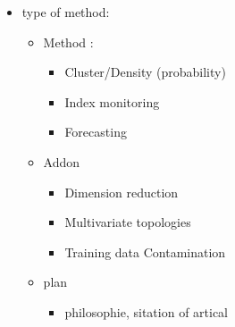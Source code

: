 \documentclass[./overview.tex]{subfiles}
\begin{document}
    \begin{itemize}
        \item type of method:
        \begin{itemize}
            \item Method :
            \begin{itemize}
                \item Cluster/Density (probability)
                \item Index monitoring
                \item Forecasting
            \end{itemize}
            \item Addon 
            \begin{itemize}
                \item Dimension reduction
                \item Multivariate topologies 
                \item Training data Contamination
            \end{itemize}
            \item plan
            \begin{itemize}
                \item philosophie, sitation of artical 
            \end{itemize}
        \end{itemize}
    \end{itemize}
\end{document}
